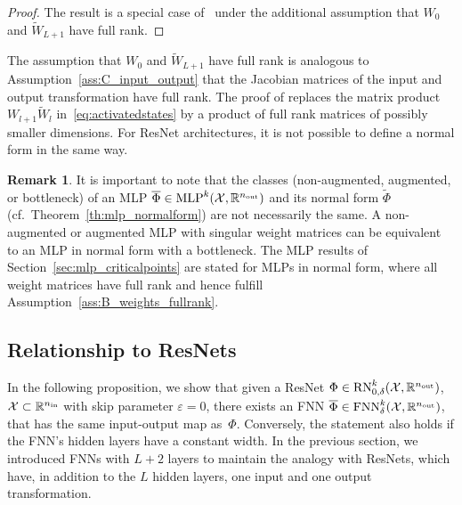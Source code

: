\documentclass[10pt]{article}
\theoremstyle{definition}
\newtheorem{remark}[theorem]{Remark}
\numberwithin{equation}{section}
\newcommand{\eps}{\varepsilon}
\newcommand{\R}{\mathbb{R}}
\newcommand*{\nout}{n_\textup{out}}
\newcommand*{\nin}{n_\textup{in}}
\newcommand*{\FNN}{\textup{FNN}_{\delta}^k(\mathcal{X},\R^{\nout})}
\begin{document}
\begin{proof}
	The result is a special case of~\cite[Theorem 3.10]{kk2025} under the additional assumption that $W_0$ and $\widetilde{W}_{L+1}$ have full rank.
\end{proof}

The assumption that $W_0$ and $\widetilde{W}_{L+1}$ have full rank is analogous to Assumption~\ref{ass:C_input_output} that the Jacobian matrices of the input and output transformation have full rank. The proof of \cite[Theorem 3.10]{kk2025} replaces the matrix product $W_{l+1}\widetilde{W}_l$ in~\eqref{eq:activatedstates} by a product of full rank matrices of possibly smaller dimensions. For ResNet architectures, it is not possible to define a normal form in the same way. 

\begin{remark}
    It is important to note that the classes (non-augmented, augmented, or bottleneck) of an MLP $\overline{\Phi} \in \textup{MLP}^k(\mathcal{X},\R^{\nout})$ and its normal form $\widetilde{\Phi}$ (cf.~Theorem~\ref{th:mlp_normalform}) are not necessarily the same. A non-augmented or augmented MLP with singular weight matrices can be equivalent to an MLP in normal form with a bottleneck. The MLP results of Section~\ref{sec:mlp_criticalpoints} are stated for MLPs in normal form, where all weight matrices have full rank and hence fulfill Assumption~\ref{ass:B_weights_fullrank}.
\end{remark}


\subsection{Relationship to ResNets}
\label{sec:mlp_relationship} 

In the following proposition, we show that given a ResNet $\Phi \in \textup{RN}_{0,\delta}^k(\mathcal{X},\R^{\nout})$, $\mathcal{X}\subset \R^{\nin}$ with skip parameter $\eps = 0$, there exists an FNN $\overline{\Phi} \in \FNN$, that has the same input-output map as~$\Phi$. Conversely, the statement also holds if the FNN's hidden layers have a constant width. In the previous section, we introduced FNNs with $L+2$ layers to maintain the analogy with ResNets, which have, in addition to the $L$ hidden layers, one input and one output transformation. 
\end{document}
